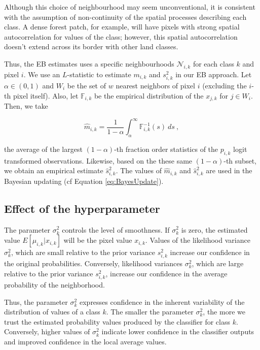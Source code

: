 \documentclass[
  shortnames]{jss}
\begin{document}
Although this choice of neighbourhood may seem unconventional, it is consistent with the assumption of non-continuity of the spatial processes describing each class. A dense forest patch, for example, will have pixels with strong spatial autocorrelation for values of the  class; however, this spatial autocorrelation doesn't extend across its border with other land classes.

Thus, the EB estimates uses a specific neighbourhoods \(\mathcal{N}_{i,k}\) for each class \(k\) and pixel \(i\). We use an \(L\)-statistic to estimate \(m_{i,k}\) and \(s^2_{i,k}\) in our EB approach. Let \(\alpha \in (0, 1)\) and \(W_{i}\) be the set of \(w\) nearest neighbors of pixel \(i\) (excluding the \(i\)-th pixel itself). Also, let \(\mathbb{F}_{i,k}\) be the empirical distribution of the \(x_{j,k}\) for \(j \in W_i\).
Then, we take

\begin{equation}
\hat{m}_{i,k} = \frac{1}{1-\alpha} \int_{\alpha}^{\infty} \mathbb{F}_{i,k}^{-1}(s) ~ ds \: , 
\end{equation}

the average of the largest \((1-\alpha)\)-th fraction order statistics of the \(p_{i,k}\) logit transformed observations. Likewise, based on the these same \((1-\alpha)\)-th subset, we obtain an empirical estimate \(\hat{s}^2_{i,k}\). The values of \(\hat{m}_{i,k}\) and \(\hat{s}^2_{i,k}\) are used in the Bayesian updating (cf Equation \ref{eq:BayesUpdate}).

\subsection{Effect of the hyperparameter}\label{effect-of-the-hyperparameter}

The parameter \(\sigma^2_k\) controls the level of smoothness. If \(\sigma^2_k\) is zero, the estimated value \({E}[\mu_{i,k} | x_{i,k}]\) will be the pixel value \(x_{i,k}\). Values of the likelihood variance \(\sigma^2_{k}\), which are small relative to the prior variance \(s^2_{i,k}\) increase our confidence in the original probabilities. Conversely, likelihood variances \(\sigma^2_{k}\), which are large relative to the prior variance \(s^2_{i,k}\), increase our confidence in the average probability of the neighborhood.

Thus, the parameter \(\sigma^2_{k}\) expresses confidence in the inherent variability of the distribution of values of a class \(k\). The smaller the parameter \(\sigma^2_{k}\), the more we trust the estimated probability values produced by the classifier for class \(k\).
Conversely, higher values of \(\sigma^2_{k}\) indicate lower confidence in the classifier outputs and improved confidence in the local average values.
\end{document}

